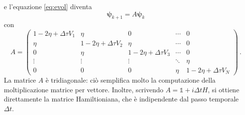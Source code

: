 \documentclass[a4paper, titlepage]{article}
\begin{document}
e l'equazione \eqref{eq:evol} diventa
\begin{equation}
    \bm{\psi}_{k+1} = A\bm{\psi}_k
    \label{eq:evol_mat}
\end{equation}
con
\begin{equation*} 
    A = \begin{pmatrix}
    1-2\eta + \Delta\tau V_1 & \eta & 0 & \cdots & 0 \\
    \eta & 1-2\eta + \Delta\tau V_2 & \eta & \cdots & 0 \\
     0 & \eta & 1-2\eta + \Delta\tau V_3 & \cdots & 0 \\
    \vdots & \vdots & \vdots & \ddots & \eta \\
    0 & 0 & 0 & \eta & 1-2\eta + \Delta\tau V_N 
    \end{pmatrix}\, . 
\end{equation*}
La matrice $A$ è tridiagonale: ciò semplifica molto la computazione della moltiplicazione matrice per vettore. Inoltre, scrivendo $A = \mathbb{1} + i\Delta t H$, si ottiene direttamente la matrice Hamiltioniana, che è indipendente dal passo temporale $\Delta t$.
\end{document}
